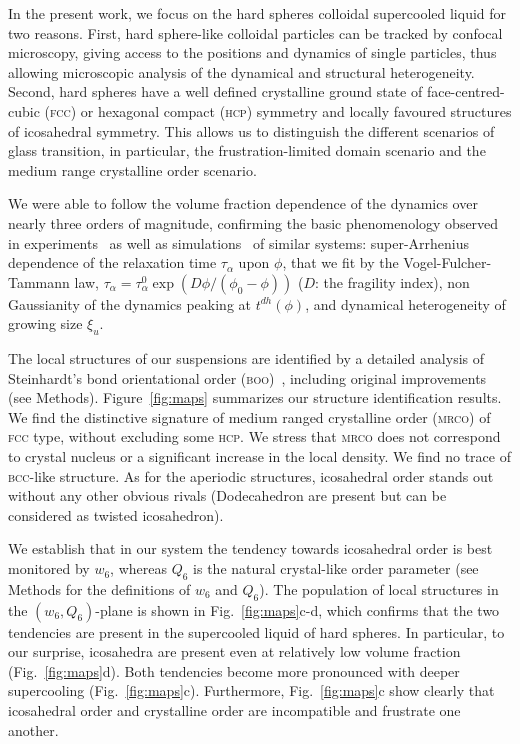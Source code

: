 In the present work, we focus on the hard spheres colloidal supercooled liquid for two reasons. First, hard sphere-like colloidal particles can be tracked by confocal microscopy, giving access to the positions and dynamics of single particles, thus allowing microscopic analysis of the dynamical and structural heterogeneity. Second, hard spheres have a well defined crystalline ground state of face-centred-cubic (\textsc{fcc}) or hexagonal compact (\textsc{hcp}) symmetry and locally favoured structures of icosahedral symmetry. This allows us to distinguish the different scenarios of glass transition, in particular, the frustration-limited domain scenario and the medium range crystalline order scenario.



We were able to follow the volume fraction dependence of the dynamics over nearly three orders of magnitude, confirming the basic phenomenology observed in experiments~\citep{pusey1987ogt, kegel2000swe, weeks2000, Berthier2005} as well as simulations~\citep{Kawasaki2010} of similar systems: super-Arrhenius dependence of the relaxation time $\tau_\alpha$ upon $\phi$, that we fit by the Vogel-Fulcher-Tammann law, 
$\tau_\alpha=\tau_\alpha^0 \exp(D\phi/(\phi_0-\phi))$ ($D$: the fragility index), non Gaussianity of the dynamics peaking at $t^{dh}(\phi)$, and dynamical heterogeneity of growing size $\xi_u$.



The local structures of our suspensions are identified by a detailed analysis of Steinhardt's bond orientational order (\textsc{boo})~\citep{steinhardt1983boo}, including original improvements (see Methods). Figure~\ref{fig:maps} summarizes our structure identification results. We find the distinctive signature of medium ranged crystalline order (\textsc{mrco}) of \textsc{fcc} type, without excluding some \textsc{hcp}. We stress that \textsc{mrco} does not correspond to crystal nucleus or a significant increase in the local density. We find no trace of \textsc{bcc}-like structure. As for the aperiodic structures, icosahedral order stands out without any other obvious rivals (Dodecahedron are present but can be considered as twisted icosahedron).



We establish that in our system the tendency towards icosahedral order is best monitored by $w_6$, whereas $Q_6$ is the natural crystal-like order parameter (see Methods for the definitions of $w_6$ and $Q_6$). The population of local structures in the $(w_6,Q_6)$-plane is shown in Fig.~\ref{fig:maps}c-d, which confirms that the two tendencies are present in the supercooled liquid of hard spheres. In particular, to our surprise, icosahedra are present even at relatively low volume fraction (Fig.~\ref{fig:maps}d). Both tendencies become more pronounced with deeper supercooling (Fig.~\ref{fig:maps}c). Furthermore, Fig.~\ref{fig:maps}c show clearly that icosahedral order and crystalline order are incompatible and frustrate one another.



